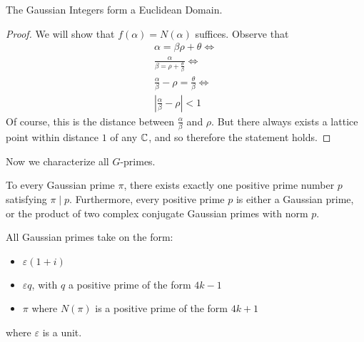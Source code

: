 \documentclass{memoir}
\begin{document}
\begin{thm}
	The Gaussian Integers form a Euclidean Domain.
\end{thm}
\begin{proof}
	We will show that \(f(\alpha) = N(\alpha)\) suffices. Observe that
	\begin{align*}
		\alpha = \beta \rho + \theta \iff\\
		\frac{\alpha}{\beta = \rho + \frac{\theta}{\beta}}\iff\\
		\frac{\alpha}{\beta}-\rho = \frac{\theta}{\beta} \iff\\
		\left| \frac{\alpha}{\beta} - \rho \right| < 1
	\end{align*}
	Of course, this is the distance between \(\frac{\alpha}{\beta}\) and \(\rho\). But there always exists a lattice point within distance \(1\) of any \(\mathbb{C}\), and so therefore the statement holds.
\end{proof}
Now we characterize all \(G\)-primes.
\begin{prop}
To every Gaussian prime \(\pi\), there exists exactly one positive prime number \(p\) satisfying \(\pi\mid p\). Furthermore, every positive prime \(p\) is either a Gaussian prime, or the product of two complex conjugate Gaussian primes with norm \(p\).
\end{prop}
\begin{thm}
	All Gaussian primes take on the form:
	\begin{itemize}
		\item \(\varepsilon(1+i)\) 
		\item \(\varepsilon q\), with \(q\) a positive prime of the form \(4k-1\) 
		\item \(\pi\) where \(N(\pi)\) is a positive prime of the form \(4k+1\)
	\end{itemize}
	where \(\varepsilon\) is a unit.
\end{thm}
\end{document}
